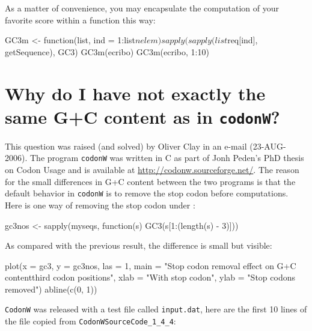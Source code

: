 \documentclass{article}
\begin{document}
As a matter of convenience, you may encapsulate the computation of your favorite score 
within a function this way:

\begin{Schunk}
\begin{Sinput}
 GC3m <- function(list, ind = 1:list$nelem) sapply(sapply(list$req[ind], 
     getSequence), GC3)
 GC3m(ecribo)
 GC3m(ecribo, 1:10)
\end{Sinput}
\end{Schunk}

\section{Why do I have not exactly the same G+C content as in \texttt{codonW}?}

This question was raised (and solved) by Oliver Clay in an e-mail (23-AUG-2006).
The program \texttt{codonW} was written in C as part of Jonh Peden's PhD thesis 
on Codon Usage \cite{codonW} and is available at \url{http://codonw.sourceforge.net/}.
The reason for the small differences in G+C content between the two programs is
that the default behavior in \texttt{codonW} is to remove the stop codon before
computations. Here is one way of removing the stop codon under \Rlogo{}:

\begin{Schunk}
\begin{Sinput}
 gc3nos <- sapply(myseqs, function(s) GC3(s[1:(length(s) - 
     3)]))
\end{Sinput}
\end{Schunk}

As compared with the previous result, the difference is small but visible:

\begin{Schunk}
\begin{Sinput}
 plot(x = gc3, y = gc3nos, las = 1, main = "Stop codon removal effect on G+C content\nin third codon positions", 
     xlab = "With stop codon", ylab = "Stop codons removed")
 abline(c(0, 1))
\end{Sinput}
\end{Schunk}

\texttt{CodonW} was released with a test file called \texttt{input.dat}, here are
the first 10 lines of the file copied from \texttt{CodonWSourceCode\_1\_4\_4}:
\end{document}
